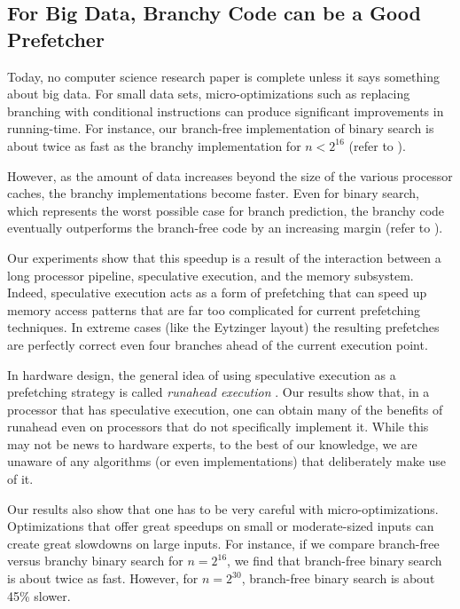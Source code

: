 \documentclass{patmorin}
\begin{document}
\subsection{For Big Data, Branchy Code can be a Good Prefetcher}

Today, no computer science research paper is complete unless it says
something about big data.  For small data sets, micro-optimizations
such as replacing branching with conditional instructions can produce
significant improvements in running-time.  For instance, our branch-free
implementation of binary search is about twice as fast as the branchy
implementation for $n<2^{16}$ (refer to ).

However, as the amount of data increases beyond the size of the
various processor caches, the branchy implementations become faster.
Even for binary search, which represents the worst possible case for
branch prediction, the branchy code eventually outperforms the branch-free
code by an increasing margin (refer to ).

Our experiments show that this speedup is a result of the interaction
between a long processor pipeline, speculative execution, and the memory
subsystem.  Indeed, speculative execution acts as a form of prefetching
that can speed up memory access patterns that are far too complicated
for current prefetching techniques.  In extreme cases (like the Eytzinger
layout) the resulting prefetches are perfectly correct even four branches
ahead of the current execution point.

In hardware design, the general idea of using speculative execution
as a prefetching strategy is called \emph{runahead execution}
\cite{mutlu.stark.ea:runahead}.  Our results show that, in a processor
that has speculative execution, one can obtain many of the benefits
of runahead even on processors that do not specifically implement it.
While this may not be news to hardware experts, to the best of our
knowledge, we are unaware of any algorithms (or even implementations)
that deliberately make  use of it.

Our results also show
that one has to be very careful with
micro-optimizations.  Optimizations that offer great speedups on small
or moderate-sized inputs can create great slowdowns on large inputs.
For instance, if we compare branch-free versus branchy binary search for
$n=2^{16}$, we find that branch-free binary search is about twice as fast.
However, for $n=2^{30}$, branch-free binary search is about 45\% slower.
\end{document}
